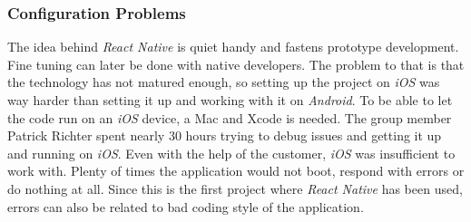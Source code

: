 \subsubsection{Configuration Problems}
\label{sssec:configuration_problems}

The idea behind \textit{React Native} is quiet handy and fastens prototype development. Fine tuning can later be done with native developers. The problem to that is that the technology has not matured enough, so setting up the project on \textit{iOS} was way harder than setting it up and working with it on \textit{Android}.
\newline
To be able to let the code run on an \textit{iOS} device, a Mac and Xcode is needed. The group member Patrick Richter spent nearly 30 hours trying to debug issues and getting it up and running on \textit{iOS}. Even with the help of the customer, \textit{iOS} was insufficient to work with. Plenty of times the application would not boot, respond with errors or do nothing at all. Since this is the first project where \textit{React Native} has been used, errors can also be related to bad coding style of the application.